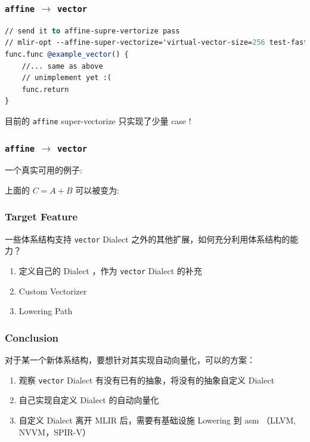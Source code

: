 \documentclass[aspectratio=169]{ctexbeamer}
\begin{document}
\begin{frame}[fragile]
    \frametitle{\texttt{affine} $\rightarrow$ \texttt{vector}}

    \begin{lstlisting}[language=llvm]
// send it to affine-supre-vertorize pass
// mlir-opt --affine-super-vectorize='virtual-vector-size=256 test-fastest-varying=0'
func.func @example_vector() {
    //... same as above
    // unimplement yet :(
    func.return
}
    \end{lstlisting}

    目前的 \texttt{affine} super-vectorize 只实现了少量 case !

\end{frame}

\begin{frame}[fragile]
    \frametitle{\texttt{affine} $\rightarrow$ \texttt{vector}}

    一个真实可用的例子:

    

    上面的 $C = A + B$ 可以被变为:

    

\end{frame}

\begin{frame}
    \frametitle{Target Feature}

    一些体系结构支持 \texttt{vector} Dialect 之外的其他扩展，如何充分利用体系结构的能力？

    \vspace{1.5em}

    \begin{enumerate}
        \item 定义自己的 Dialect ，作为 \texttt{vector} Dialect 的补充
        \item Custom Vectorizer
        \item Lowering Path
    \end{enumerate}

\end{frame}


\begin{frame}
    \frametitle{Conclusion}

    对于某一个新体系结构，要想针对其实现自动向量化，可以的方案：

    \begin{enumerate}
        \item 观察 \texttt{vector} Dialect 有没有已有的抽象，将没有的抽象自定义 Dialect
        \item 自己实现自定义 Dialect 的自动向量化
        \item 自定义 Dialect 离开 MLIR 后，需要有基础设施 Lowering 到 asm （LLVM, NVVM，SPIR-V）
    \end{enumerate}

\end{frame}
\end{document}
